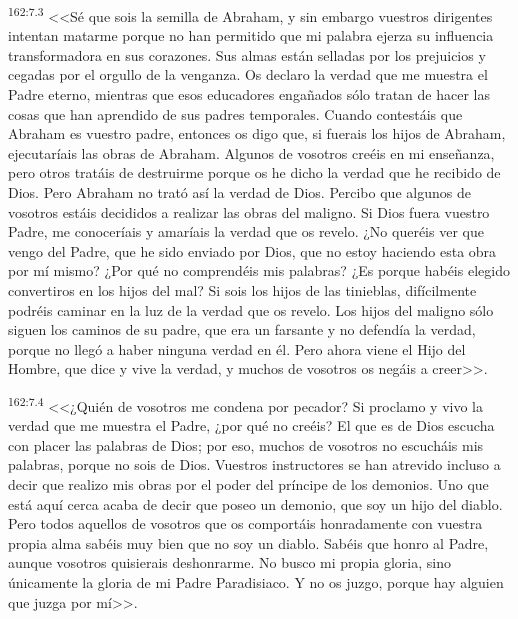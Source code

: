\par 
\textsuperscript{162:7.3} <<Sé que sois la semilla de Abraham, y sin embargo vuestros dirigentes intentan matarme porque no han permitido que mi palabra ejerza su influencia transformadora en sus corazones. Sus almas están selladas por los prejuicios y cegadas por el orgullo de la venganza. Os declaro la verdad que me muestra el Padre eterno, mientras que esos educadores engañados sólo tratan de hacer las cosas que han aprendido de sus padres temporales. Cuando contestáis que Abraham es vuestro padre, entonces os digo que, si fuerais los hijos de Abraham, ejecutaríais las obras de Abraham. Algunos de vosotros creéis en mi enseñanza, pero otros tratáis de destruirme porque os he dicho la verdad que he recibido de Dios. Pero Abraham no trató así la verdad de Dios. Percibo que algunos de vosotros estáis decididos a realizar las obras del maligno. Si Dios fuera vuestro Padre, me conoceríais y amaríais la verdad que os revelo. ¿No queréis ver que vengo del Padre, que he sido enviado por Dios, que no estoy haciendo esta obra por mí mismo? ¿Por qué no comprendéis mis palabras? ¿Es porque habéis elegido convertiros en los hijos del mal? Si sois los hijos de las tinieblas, difícilmente podréis caminar en la luz de la verdad que os revelo. Los hijos del maligno sólo siguen los caminos de su padre, que era un farsante y no defendía la verdad, porque no llegó a haber ninguna verdad en él. Pero ahora viene el Hijo del Hombre, que dice y vive la verdad, y muchos de vosotros os negáis a creer>>.

\par 
\textsuperscript{162:7.4} <<¿Quién de vosotros me condena por pecador? Si proclamo y vivo la verdad que me muestra el Padre, ¿por qué no creéis? El que es de Dios escucha con placer las palabras de Dios; por eso, muchos de vosotros no escucháis mis palabras, porque no sois de Dios. Vuestros instructores se han atrevido incluso a decir que realizo mis obras por el poder del príncipe de los demonios. Uno que está aquí cerca acaba de decir que poseo un demonio, que soy un hijo del diablo. Pero todos aquellos de vosotros que os comportáis honradamente con vuestra propia alma sabéis muy bien que no soy un diablo. Sabéis que honro al Padre, aunque vosotros quisierais deshonrarme. No busco mi propia gloria, sino únicamente la gloria de mi Padre Paradisiaco. Y no os juzgo, porque hay alguien que juzga por mí>>.

